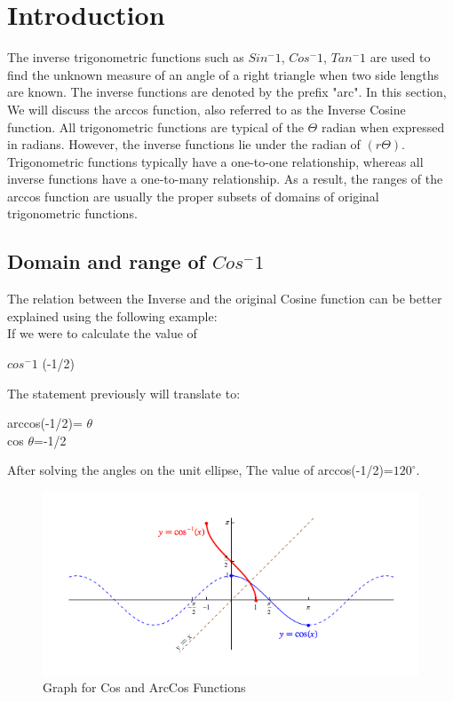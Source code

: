 \documentclass{article}
\begin{document}
    \section{Introduction}
    The inverse trigonometric functions such as $Sin^-1$, $Cos^-1$, $Tan^-1$ are used to find the unknown measure of an angle of a right triangle when two side lengths are known. The inverse functions are denoted by the prefix "arc". In this section, We will discuss the arccos function, also referred to as the Inverse Cosine function. All trigonometric functions are typical of the $\Theta$  radian when expressed in radians. However, the inverse functions lie under the radian of $(r\Theta)$. Trigonometric functions typically have a one-to-one relationship, whereas all inverse functions have a one-to-many relationship. As a result, the ranges of the arccos function are usually the proper subsets of domains of original trigonometric functions.
        {

        \subsection{Domain and range of $Cos^-1$}}
    \justify
    The relation between the Inverse and the original Cosine function can be better explained using the following example:
    \\     If we were to calculate the value of\begin{center}
                                                   $cos^-1$ (-1/2)
    \end{center}
    The statement previously will translate to:
    \begin{center}
        arccos(-1/2)= $\theta$\\
        cos $\theta$=-1/2\\
    \end{center}
    After solving the angles on the unit ellipse, The value of arccos(-1/2)=$120^\circ$.
    \begin{figure}[hbt!]
        \centering
        \includegraphics[width=1.0\textwidth]{Images/arccos.png}
        \caption{Graph for Cos and ArcCos Functions}
        \label{fig:Speed vs. Torque from Pittman}
    \end{figure}
\end{document}

